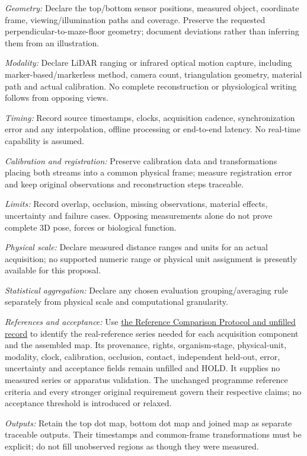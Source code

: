\noindent\textit{Geometry:} Declare the top/bottom sensor positions, measured object, coordinate frame, viewing/illumination paths and coverage. Preserve the requested perpendicular-to-maze-floor geometry; document deviations rather than inferring them from an illustration.\par
\noindent\textit{Modality:} Declare LiDAR ranging or infrared optical motion capture, including marker-based/markerless method, camera count, triangulation geometry, material path and actual calibration. No complete reconstruction or physiological writing follows from opposing views.\par
\noindent\textit{Timing:} Record source timestamps, clocks, acquisition cadence, synchronization error and any interpolation, offline processing or end-to-end latency. No real-time capability is assumed.\par
\noindent\textit{Calibration and registration:} Preserve calibration data and transformations placing both streams into a common physical frame; measure registration error and keep original observations and reconstruction steps traceable.\par
\noindent\textit{Limits:} Record overlap, occlusion, missing observations, material effects, uncertainty and failure cases. Opposing measurements alone do not prove complete 3D pose, forces or biological function.\par
\noindent\textit{Physical scale:} Declare measured distance ranges and units for an actual acquisition; no supported numeric range or physical unit assignment is presently available for this proposal.\par
\noindent\textit{Statistical aggregation:} Declare any chosen evaluation grouping/averaging rule separately from physical scale and computational granularity.\par
\noindent\textit{References and acceptance:} Use \hyperref[app:reference-comparison-protocol]{the Reference Comparison Protocol and unfilled record} to identify the real-reference series needed for each acquisition component and the assembled map. Its provenance, rights, organism-stage, physical-unit, modality, clock, calibration, occlusion, contact, independent held-out, error, uncertainty and acceptance fields remain unfilled and HOLD. It supplies no measured series or apparatus validation. The unchanged programme reference criteria and every stronger original requirement govern their respective claims; no acceptance threshold is introduced or relaxed.\par
\noindent\textit{Outputs:} Retain the top dot map, bottom dot map and joined map as separate traceable outputs. Their timestamps and common-frame transformations must be explicit; do not fill unobserved regions as though they were measured.\par
